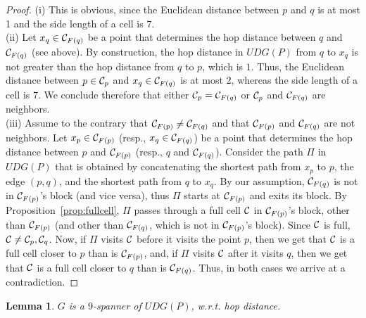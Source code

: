 \documentclass[11pt,letter]{article}
\newtheorem{lemma}[theorem]{Lemma}
\def\clst#1{{\C_{{{F}}({{#1}})}}}
\def\C{{\cal{C}}}
\def\graph{{{G}}}
\def\UDG{{U\!DG}}
\begin{document}
\begin{proof}
(i) This is obvious, since the Euclidean distance between $p$ and $q$ is at most 1 and the side length of a cell is $7$.
\\
(ii) Let $x_q \in \clst{q}$ be a point that determines the hop distance between $q$ and $\clst{q}$ (see above).
By construction, the hop distance in $\UDG(P)$ from $q$ to $x_q$ is not greater than the hop distance from $q$ to $p$, which is $1$.
Thus, the Euclidean distance between $p \in \C_p$ and $x_q \in \clst{q}$ is at most $2$, whereas the side length of a cell is $7$.
We conclude therefore that either $\C_p = \clst{q}$ or $\C_p$ and $\clst{q}$ are neighbors.
\\
(iii) Assume to the contrary that $\clst{p} \ne \clst{q}$ and that $\clst{p}$ and $\clst{q}$ are not neighbors.
Let $x_p \in \clst{p}$ (resp., $x_q \in \clst{q}$) be a point that determines the hop distance between $p$ and $\clst{p}$ (resp., $q$ and $\clst{q}$).
Consider the path $\Pi$ in $\UDG(P)$ that is obtained by concatenating the shortest path from $x_p$ to $p$, the edge $(p,q)$, and the shortest path from $q$ to $x_q$.
By our assumption,
$\clst{q}$ is not in $\clst{p}$'s block (and vice versa),
thus $\Pi$ starts at $\clst{p}$ and exits its block. By
Proposition~\ref{prop:fullcell},
$\Pi$ passes through a full cell $\C$ in $\clst{p}$'s block,
other than $\clst{p}$ (and other than $\clst{q}$, which is not in $\clst{p}$'s block).
Since $\C$ is full, $\C \neq \C_p,\C_q$. Now, if $\Pi$ visits $\C$ before it visits the point $p$,
then we get that $\C$ is a full cell closer to $p$ than is $\clst{p}$, and, if $\Pi$ visits $\C$ after it visits $q$,
then we get that $\C$ is a full cell closer to $q$ than is $\clst{q}$. Thus,
in both cases we arrive at a contradiction.
\end{proof}



\begin{lemma}
\label{lemma:hop_distance}
$\graph$ is a $9$-spanner of $\UDG(P)$, w.r.t. hop distance.
\end{lemma}
\end{document}
